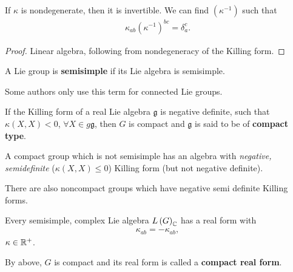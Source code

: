 \begin{proposition}
    If $\kappa$ is nondegenerate, then it is invertible. We can find $\left( \kappa^{-1} \right) $ such that
    \begin{align}
        \kappa_{ab} \left( \kappa^{-1} \right)^{bc} = \delta_{a}^{c}
    .\end{align}
\end{proposition}

\begin{proof}
    Linear algebra, following from nondegeneracy of the Killing form.
\end{proof}

\begin{definition}
    A Lie group is \textbf{semisimple} if its Lie algebra is semisimple. 
\end{definition}

\begin{note}
    Some authors only use this term for connected Lie groups.
\end{note}

\begin{proposition}
    If the Killing form of a real Lie algebra $\mathfrak{g}$ is negative definite, such that $\kappa \left( X,X \right) <0$, $\forall X \in g \mathfrak{g}$,
    then $G$ is compact and $\mathfrak{g}$ is said to be of \textbf{compact type}.
\end{proposition}

\begin{proposition}
    A compact group which is not semisimple has an algebra with \emph{negative, semidefinite} ($\kappa \left( X,X \right) \leq 0$) Killing form (but not negative definite).
\end{proposition}

\begin{note}
    There are also noncompact groups which have negative semi definite Killing forms.
\end{note} 

\begin{proposition}
    Every semisimple, complex Lie algebra $L \left( G \right)_{\mathbb{C}}$ has a real form with
    \begin{align}
        \kappa_{ab} = -\kappa_{ab}
    ,\end{align}
    $\kappa \in \mathbb{R}^{+}$.
\end{proposition}

By above, $G$ is compact and its real form is called a \textbf{compact real form}.

